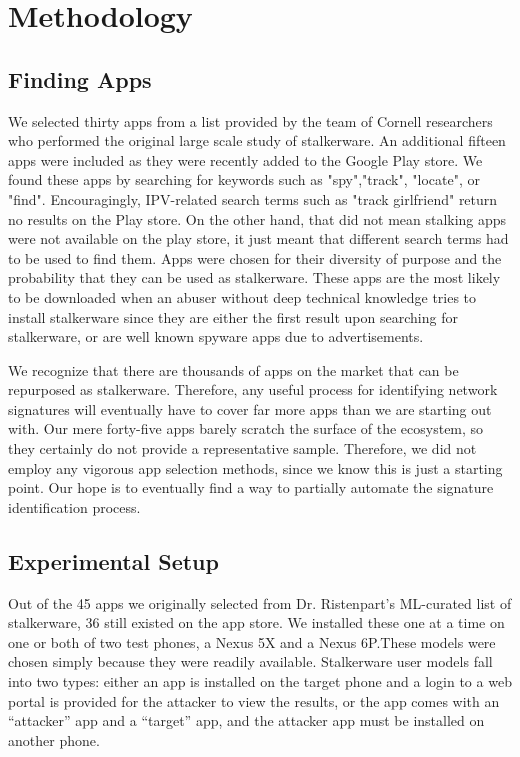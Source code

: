 \documentclass[acmtog]{acmart}
\begin{document}
\section{Methodology}
\subsection{Finding Apps}
We selected thirty apps from a list provided by the team of Cornell researchers 
who performed the original large scale study of 
stalkerware\cite{chatterjee_spyware_2018}. An 
additional fifteen apps were included as they were recently added to the Google 
Play store. We found these apps by searching for keywords such as 
"spy","track", "locate", or "find". Encouragingly, IPV-related search terms 
such as "track girlfriend" return no results on the Play store. On the other 
hand, that did not mean stalking apps were not available on the play store, it 
just meant that different search terms had to be used to find them. Apps were 
chosen for their diversity of purpose and the probability that 
they can be used as stalkerware. These apps are the most likely to be 
downloaded when an abuser without deep technical knowledge tries to install 
stalkerware since they are either the first result upon searching for 
stalkerware, or are well known spyware apps due to advertisements.

We recognize that there are thousands of apps on the market that can be 
repurposed as stalkerware. Therefore, any useful process for identifying 
network signatures will eventually have to cover far more apps than we are 
starting out with. Our mere forty-five apps barely scratch the surface of the 
ecosystem, so they certainly do not provide a representative sample. Therefore, 
we did not employ any vigorous app selection methods, since we know this is 
just a starting point. Our hope is to eventually find a way to partially 
automate the signature identification process.

\subsection{Experimental Setup}
Out of the 45 apps we originally selected from Dr. Ristenpart's ML-curated list 
of stalkerware, 36 still existed on the app store. We installed these one at a 
time on one or both of two test phones, a Nexus 5X and a Nexus 6P.These models 
were chosen simply because they were readily available. Stalkerware user 
models  fall into two types: either an app is installed on the target phone and 
a login to a web portal is provided for the attacker to view the results, or 
the app comes with an ``attacker'' app and a ``target'' app, and the attacker 
app must be installed on another phone.
\end{document}
